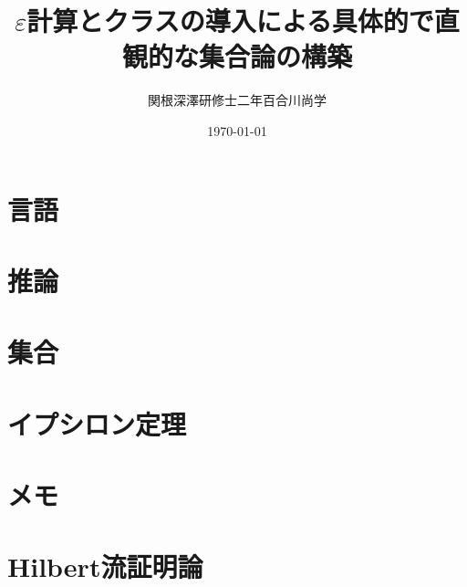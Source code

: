 \documentclass[a4j,10.5pt,oneside,openany]{jsbook}
\title{$\varepsilon$計算とクラスの導入による具体的で直観的な集合論の構築}
\author{関根深澤研修士二年百合川尚学}
\date{\today}
\theoremstyle{mystyle}
\begin{document}
\maketitle
\tableofcontents
\frontmatter
\mainmatter



\chapter{言語}
	
	
	

\chapter{推論}
	
	

\chapter{集合}	
	
	
	
	
	
	
	
	
	
	
	
	

\chapter{イプシロン定理}
	
	
	

\chapter{メモ}
	
	

\chapter{Hilbert流証明論}
	


\end{document}
